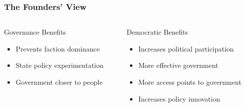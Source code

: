 \documentclass[10pt]{beamer}
\begin{document}
\begin{frame}
\frametitle{The Founders' View}

\begin{columns}
\begin{column}{0.48\textwidth}
\begin{block}{Governance Benefits}
\pause
\begin{itemize}
\item Prevents faction dominance
\item State policy experimentation
\item Government closer to people
\end{itemize}
\end{block}
\end{column}

\begin{column}{0.48\textwidth}
\begin{block}{Democratic Benefits}
\pause
\begin{itemize}
\item Increases political participation
\item More effective government
\item More access points to government
\item Increases policy innovation
\end{itemize}
\end{block}
\end{column}
\end{columns}

\end{frame}
\end{document}
